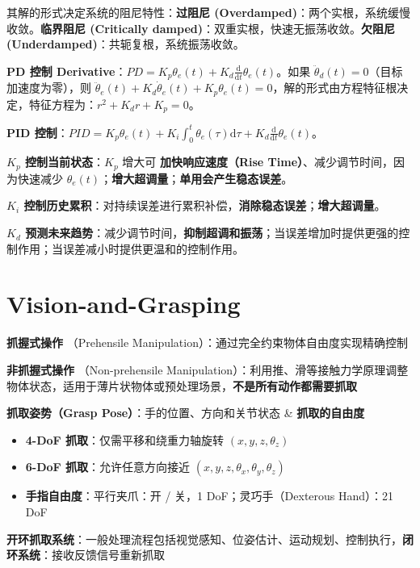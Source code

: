 \documentclass[
  8pt]{extarticle}
\providecommand{\tightlist}{%
  \setlength{\itemsep}{0pt}\setlength{\parskip}{0pt}}
\begin{document}
\begin{multicols*}{4}
其解的形式决定系统的阻尼特性：\textbf{过阻尼
(Overdamped)}：两个实根，系统缓慢收敛。\textbf{临界阻尼 (Critically
damped)}：双重实根，快速无振荡收敛。\textbf{欠阻尼
(Underdamped)}：共轭复根，系统振荡收敛。

\textbf{PD 控制
Derivative}：\(PD = K_p \theta_e(t) + K_d \frac{\mathrm{d}}{\mathrm{d}t}\theta_e(t)\)。如果
\(\ddot{\theta}_d(t) = 0\)（目标加速度为零），则
\(\ddot{\theta}_e(t) + K_d \dot{\theta}_e(t) + K_p \theta_e(t) = 0\)，解的形式由方程特征根决定，特征方程为：\(r^2 + K_d r + K_p = 0\)。

\textbf{PID
控制}：\(PID = K_p \theta_e(t) + K_i \int_0^t \theta_e(\tau)\mathrm{d}\tau + K_d \frac{\mathrm{d}}{\mathrm{d}t}\theta_e(t)\)。

\textbf{\(K_p\) 控制当前状态}：\(K_p\) 增大可 \textbf{加快响应速度（Rise
Time）}、减少调节时间，因为快速减少
\(\theta_e(t)\)；\textbf{增大超调量}；\textbf{单用会产生稳态误差}。

\textbf{\(K_i\)
控制历史累积}：对持续误差进行累积补偿，\textbf{消除稳态误差}；\textbf{增大超调量}。

\textbf{\(K_d\)
预测未来趋势}：减少调节时间，\textbf{抑制超调和振荡}；当误差增加时提供更强的控制作用；当误差减小时提供更温和的控制作用。

\hypertarget{vision-and-grasping}{%
\section{Vision-and-Grasping}\label{vision-and-grasping}}

\textbf{抓握式操作} （Prehensile
Manipulation）：通过完全约束物体自由度实现精确控制

\textbf{非抓握式操作} （Non-prehensile
Manipulation）：利用推、滑等接触力学原理调整物体状态，适用于薄片状物体或预处理场景，\textbf{不是所有动作都需要抓取}

\textbf{抓取姿势（Grasp Pose）}：手的位置、方向和关节状态 \&
\textbf{抓取的自由度}

\begin{itemize}
\tightlist
\item
  \textbf{4-DoF 抓取}：仅需平移和绕重力轴旋转 \((x, y, z, \theta_z)\)
\item
  \textbf{6-DoF 抓取}：允许任意方向接近
  \((x, y, z, \theta_x, \theta_y, \theta_z)\)
\item
  \textbf{手指自由度}：平行夹爪：开 / 关，1 DoF；灵巧手（Dexterous
  Hand）：21 DoF
\end{itemize}

\textbf{开环抓取系统}：一般处理流程包括视觉感知、位姿估计、运动规划、控制执行，\textbf{闭环系统}：接收反馈信号重新抓取


\end{multicols*}
\end{document}
